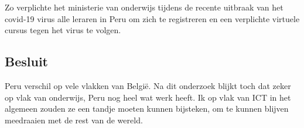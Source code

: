 Zo verplichte het ministerie van onderwijs tijdens de recente uitbraak van het covid-19 virus alle leraren in Peru om zich te registreren en een verplichte virtuele cursus tegen het virus te volgen. \autocite{Educacion2020}

\subsection{Besluit}
Peru verschil op vele vlakken van België. Na dit onderzoek blijkt toch dat zeker op vlak van onderwijs, Peru nog heel wat werk heeft. Ik op vlak van ICT in het algemeen zouden ze een tandje moeten kunnen bijsteken, om te kunnen blijven meedraaien met de rest van de wereld. 



